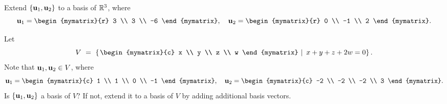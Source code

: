 \begin{enumialphparenastyle}
\begin{ex}
  Extend $\left\{\mbox{\bf u}_1,\mbox{\bf u}_2\right\}$ to a basis of $\mathbb{R}^3$, where
  \begin{equation*}
    \vect{u}_1 = \begin{mymatrix}{r} 3 \\ 3 \\ -6 \end{mymatrix},\quad
    \vect{u}_2 = \begin{mymatrix}{r} 0 \\ -1 \\ 2 \end{mymatrix}.
  \end{equation*}
\end{ex}

\begin{ex}
  Let
  \begin{equation*}
    V ~=~ \set{\left.
        \begin{mymatrix}{c} x \\ y \\ z \\ w \end{mymatrix}
        ~\right\vert~
      x+y+z+2w = 0
    }.
  \end{equation*}
  Note that $\mbox{\bf u}_1,\mbox{\bf u}_2\in V$, where
  \begin{equation*}
    \vect{u}_1 = \begin{mymatrix}{c} 1 \\ 1 \\ 0 \\ -1 \end{mymatrix},\quad
    \vect{u}_2 = \begin{mymatrix}{c} -2 \\ -2 \\ -2 \\ 3 \end{mymatrix}.
  \end{equation*}
  Is $\left\{\mbox{\bf u}_1,\mbox{\bf u}_2\right\}$ a basis of $V$? If not, extend it
  to a basis of $V$ by adding additional basis vectors.
\end{ex}


\end{enumialphparenastyle}
